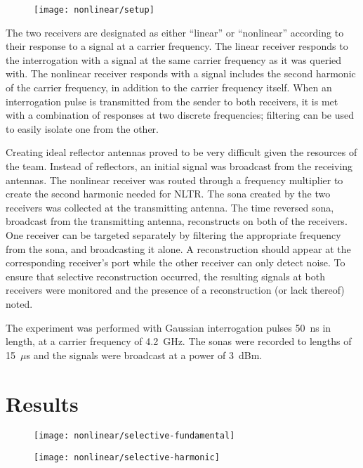 \begin{figure}[t]
\centering
\texttt{[image: nonlinear/setup]}
    \caption[]{}
    \label{fig:selective-setup}
\end{figure}

The two receivers are designated as either ``linear'' or ``nonlinear'' according to their response to a signal at a carrier frequency. The linear receiver responds to the interrogation with a signal at the same carrier frequency as it was queried with. The nonlinear receiver responds with a signal includes the second harmonic of the carrier frequency, in addition to the carrier frequency itself. When an interrogation pulse is transmitted from the sender to both receivers, it is met with a combination of responses at two discrete frequencies; filtering can be used to easily isolate one from the other.

Creating ideal reflector antennas proved to be very difficult given the resources of the team.  Instead of reflectors, an initial signal was broadcast from the receiving antennas.  The nonlinear receiver was routed through a frequency multiplier to create the second harmonic needed for NLTR.  The sona created by the two receivers was collected at the transmitting antenna.  The time reversed sona, broadcast from the transmitting antenna, reconstructs on both of the receivers.  One receiver can be targeted separately by filtering the appropriate frequency from the sona, and broadcasting it alone. A reconstruction should appear at the corresponding receiver’s port while the other receiver can only detect noise. To ensure that selective reconstruction occurred, the resulting signals at both receivers were monitored and the presence of a reconstruction (or lack thereof) noted. 

The experiment was performed with Gaussian interrogation pulses 50~ns in length, at a carrier frequency of 4.2~GHz. The sonas were recorded to lengths of 15~$\mu$s and the signals were broadcast at a power of 3~dBm.

\section{Results}
\label{sec:selective-results}

\begin{figure}[h]
\centering
\texttt{[image: nonlinear/selective-fundamental]}
    \caption[]{}
    \label{fig:selective-fundamental}
\end{figure}
\begin{figure}[h]
\centering
\texttt{[image: nonlinear/selective-harmonic]}
    \caption[]{}
    \label{fig:selective-harmonic}
\end{figure}

